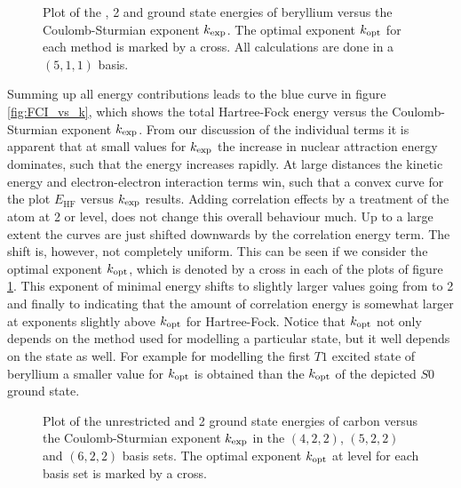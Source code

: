 \begin{figure}
	\centering
	\caption[
		Plot of the \HF, {\MP}2 and \FCI energies
		versus the \CS exponent $\kexp$
	]{
		Plot of the \HF, {\MP}2 and \FCI ground state energies
		of beryllium
		versus the Coulomb-Sturmian exponent $\kexp$.
		The optimal exponent $k_\text{opt}$ for each
		method is marked by a cross.
		All calculations are done in a $(5,1,1)$ \CS basis.
	}
	\label{fig:FCI_vs_k}
\end{figure}
Summing up all energy contributions leads to the blue curve
in figure \vref{fig:FCI_vs_k},
which shows the total Hartree-Fock energy versus
the Coulomb-Sturmian exponent $\kexp$.
From our discussion of the individual terms
it is apparent that at small values for $\kexp$
the increase in nuclear attraction energy dominates,
such that the \HF energy increases rapidly.
At large distances the kinetic energy and electron-electron
interaction terms win, such that a convex curve
for the plot $E_\text{HF}$ versus $\kexp$ results.
Adding correlation effects by a treatment of the atom at {\MP}2 or \FCI level,
does not change this overall behaviour much.
Up to a large extent the curves are just shifted downwards by the
correlation energy term.
The shift is, however, not completely uniform.
This can be seen if we consider the optimal \CS exponent $k_\text{opt}$,
which is denoted by a cross in each of the plots of figure \ref{fig:FCI_vs_k}.
This exponent of minimal energy shifts
to slightly larger values going from \HF to {\MP}2 and finally to \FCI
indicating that the amount of correlation energy is somewhat larger
at exponents slightly above $k_\text{opt}$ for Hartree-Fock.
Notice that $k_\text{opt}$ not only depends on the method used for modelling
a particular state,
but it well depends on the state as well.
For example for modelling the first $T1$ excited state of beryllium
a smaller value for $k_\text{opt}$ is obtained than the \FCI $k_\text{opt}$
of the depicted $S0$ ground state.

\begin{figure}
	\centering
	\caption[
		Dependency of the \HF and {\MP}2 energies
		on the \CS basis set parameters
	]{
		Plot of the unrestricted
		\HF and {\MP}2 ground state energies of carbon
		versus the Coulomb-Sturmian exponent $\kexp$
		in the $(4,2,2)$, $(5,2,2)$ and $(6,2,2)$ basis sets.
		The optimal exponent $k_\text{opt}$ at \HF level
		for each basis set is marked by a cross.
	}
	\label{fig:EHF_vs_k}
\end{figure}


